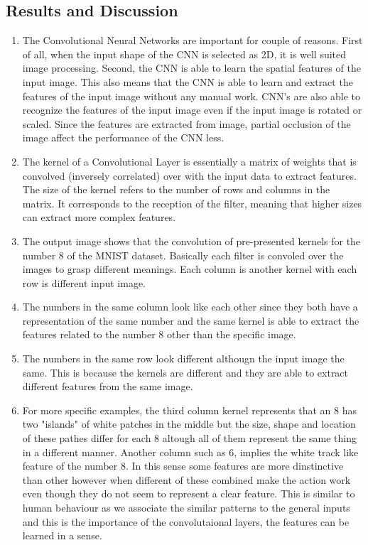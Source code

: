 \documentclass[3p,times,procedia]{elsarticle}
\begin{document}
\subsection{\textbf{Results and Discussion}}
\begin{enumerate}
    \item The Convolutional Neural Networks are important for couple of reasons.
    First of all, when the input shape of the CNN is selected as 2D, it is well suited image processing.
    Second, the CNN is able to learn the spatial features of the input image. This also means that the CNN is able to learn and extract the features of the input image without any manual work.
    CNN's are also able to recognize the features of the input image even if the input image is rotated or scaled.
    Since the features are extracted from image, partial occlusion of the image affect the performance of the CNN less.
    \item The kernel of a Convolutional Layer  is essentially a matrix of weights that is convolved (inversely correlated) over with the input data to extract features.
    The size of the kernel refers to the number of rows and columns in the matrix. It corresponds to the reception of the filter, meaning that higher sizes can extract more complex features. 
    
    \item The output image shows that the convolution of pre-presented kernels for the number 8 of the MNIST dataset. Basically each filter is convoled over the images to grasp different meanings. Each column is another kernel with each row is different input image.
    
    \item The numbers in the same column look like each other since they both have a representation of the same number and the same kernel is able to extract the features related to the number 8 other than the specific image.
    
    \item The numbers in the same row look different althougn the input image the same. This is because the kernels are different and they are able to extract different features from the same image.
    
    \item For more specific examples, the third column kernel represents that an 8 has two "islands" of white patches in the middle but the size, shape and location of these pathes differ for each 8 altough all of them represent the same thing in a different manner.
     Another column such as 6, implies the white track like feature of the number 8. In this sense some features are more dinstinctive than other however when different of these combined make the action work even though they do not seem to represent a clear feature.
     This is similar to human behaviour as we associate the similar patterns to the general inputs and this is the importance of the convolutaional layers, the features can be learned in a sense.
\end{enumerate}
\end{document}
